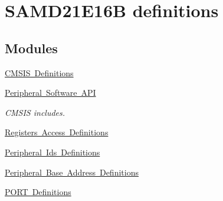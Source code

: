 \hypertarget{group___s_a_m_d21_e16_b__definitions}{}\section{S\+A\+M\+D21\+E16B definitions}
\label{group___s_a_m_d21_e16_b__definitions}
\subsection*{Modules}
\begin{DoxyCompactItemize}
\item 
\mbox{\hyperlink{group___s_a_m_d21_e16_b__cmsis}{C\+M\+S\+I\+S Definitions}}
\item 
\mbox{\hyperlink{group___s_a_m_d21_e16_b__api}{Peripheral Software A\+PI}}
\begin{DoxyCompactList}\small\item\em C\+M\+S\+IS includes. \end{DoxyCompactList}\item 
\mbox{\hyperlink{group___s_a_m_d21_e16_b__reg}{Registers Access Definitions}}
\item 
\mbox{\hyperlink{group___s_a_m_d21_e16_b__id}{Peripheral Ids Definitions}}
\item 
\mbox{\hyperlink{group___s_a_m_d21_e16_b__base}{Peripheral Base Address Definitions}}
\item 
\mbox{\hyperlink{group___s_a_m_d21_e16_b__port}{P\+O\+R\+T Definitions}}
\end{DoxyCompactItemize}
